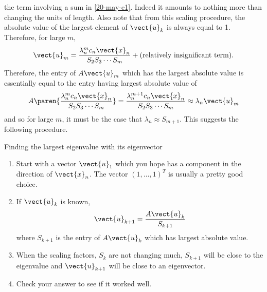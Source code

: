 the term involving a sum in {\eqref{20-may-e1}}. Indeed it amounts to nothing more
than changing the units of length. Also note that from this scaling
procedure, the absolute value of the largest element of $\vect{u}_{k}$ is
always equal to 1. Therefore, for large $m$,
\begin{equation*}
\vect{u}_{m}=\vspace{0.05in}\frac{\lambda _{n}^{m}c_{n}\vect{x}_{n}}{S_{2}S_{3}\cdots S_{m}}+(\text{relatively insignificant term}) .
\end{equation*}
Therefore, the entry of $A\vect{u}_{m}$ which has the largest absolute value
is essentially equal to the entry having largest absolute value of
\begin{equation*}
A\paren{\vspace{0.05in}\frac{\lambda _{n}^{m}c_{n}\vect{x}_{n}}{S_{2}S_{3}\cdots S_{m}}} =\vspace{0.05in}\frac{\lambda _{n}^{m+1}c_{n}
\vect{x}_{n}}{S_{2}S_{3}\cdots S_{m}}\approx \lambda _{n}\vect{u}_{m}
\end{equation*}%
and so for large $m$, it must be the case that $\lambda _{n}\approx S_{m+1}$.
This suggests the following procedure.

\begin{procedure}{Finding the largest eigenvalue with its eigenvector}{}
\begin{enumerate}
\item Start with a vector $\vect{u}_{1}$ which you hope has a component in
the direction of $\vect{x}_{n}$. The vector $(1,\ldots,1) ^{T}$
is usually a pretty good choice.

\item If $\vect{u}_{k}$ is known,
\begin{equation*}
\vect{u}_{k+1}=\frac{A\vect{u}_{k}}{S_{k+1}}
\end{equation*}
where $S_{k+1}$ is the entry of $A\vect{u}_{k}$ which has largest absolute
value.

\item When the scaling factors, $S_{k}$ are not changing much, $S_{k+1}$
will be close to the eigenvalue and $\vect{u}_{k+1}$ will be close to an
eigenvector.

\item Check your answer to see if it worked well.
\end{enumerate}
\end{procedure}

